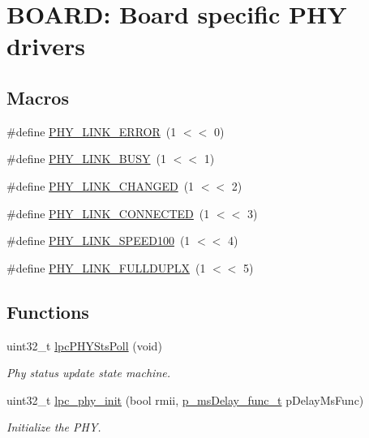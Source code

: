 \hypertarget{group___b_o_a_r_d___p_h_y}{\section{B\+O\+A\+R\+D\+: Board specific P\+H\+Y drivers}
\label{group___b_o_a_r_d___p_h_y}
}
\subsection*{Macros}
\begin{DoxyCompactItemize}
\item 
\#define \hyperlink{group___b_o_a_r_d___p_h_y_ga3dcfb76aa2527e963441a79c5420ec5f}{P\+H\+Y\+\_\+\+L\+I\+N\+K\+\_\+\+E\+R\+R\+O\+R}~(1 $<$$<$ 0)
\item 
\#define \hyperlink{group___b_o_a_r_d___p_h_y_gae9570359588a14f9e79b363a4861b461}{P\+H\+Y\+\_\+\+L\+I\+N\+K\+\_\+\+B\+U\+S\+Y}~(1 $<$$<$ 1)
\item 
\#define \hyperlink{group___b_o_a_r_d___p_h_y_ga024ecb53e2bd08b11916fe3df9881fe6}{P\+H\+Y\+\_\+\+L\+I\+N\+K\+\_\+\+C\+H\+A\+N\+G\+E\+D}~(1 $<$$<$ 2)
\item 
\#define \hyperlink{group___b_o_a_r_d___p_h_y_ga4355878edd2f4e71c449318d65caff96}{P\+H\+Y\+\_\+\+L\+I\+N\+K\+\_\+\+C\+O\+N\+N\+E\+C\+T\+E\+D}~(1 $<$$<$ 3)
\item 
\#define \hyperlink{group___b_o_a_r_d___p_h_y_gaa09dfe28e00af59bceb69ef503f88e68}{P\+H\+Y\+\_\+\+L\+I\+N\+K\+\_\+\+S\+P\+E\+E\+D100}~(1 $<$$<$ 4)
\item 
\#define \hyperlink{group___b_o_a_r_d___p_h_y_ga4b400b487b0e6a1bfc52fbc50e72be3e}{P\+H\+Y\+\_\+\+L\+I\+N\+K\+\_\+\+F\+U\+L\+L\+D\+U\+P\+L\+X}~(1 $<$$<$ 5)
\end{DoxyCompactItemize}
\subsection*{Functions}
\begin{DoxyCompactItemize}
\item 
uint32\+\_\+t \hyperlink{group___b_o_a_r_d___p_h_y_gab5a4203ab2c54fa3fb243e784f9b3ddc}{lpc\+P\+H\+Y\+Sts\+Poll} (void)
\begin{DoxyCompactList}\small\item\em Phy status update state machine. \end{DoxyCompactList}\item 
uint32\+\_\+t \hyperlink{group___b_o_a_r_d___p_h_y_ga9d09c9f5e31d5213b738ab80863776d5}{lpc\+\_\+phy\+\_\+init} (bool rmii, \hyperlink{group___b_o_a_r_d___c_o_m_m_o_n___a_p_i_gabd040b6a5eb9bbf2697cbe943b8ecbc8}{p\+\_\+ms\+Delay\+\_\+func\+\_\+t} p\+Delay\+Ms\+Func)
\begin{DoxyCompactList}\small\item\em Initialize the P\+H\+Y. \end{DoxyCompactList}\end{DoxyCompactItemize}


